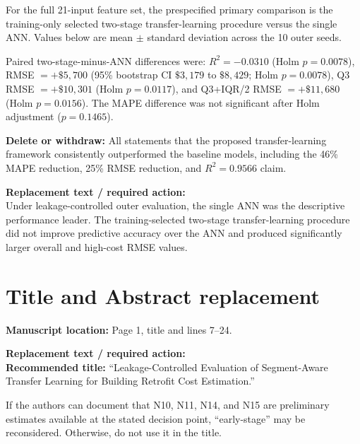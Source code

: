 \documentclass[10pt]{article}
\newcommand{\loc}[1]{\textbf{Manuscript location:} #1}
\newcommand{\replacewith}[1]{\textbf{Replacement text / required action:}\\{\color{revisionblue}#1}}
\newcommand{\deleteitem}[1]{\textbf{Delete or withdraw:} {\color{deleteRed}#1}}
\begin{document}
For the full 21-input feature set, the prespecified primary comparison is the training-only selected two-stage transfer-learning procedure versus the single ANN. Values below are mean $\pm$ standard deviation across the 10 outer seeds.

\begin{center}
\end{center}

Paired two-stage-minus-ANN differences were: $R^2=-0.0310$ (Holm $p=0.0078$), RMSE $=+\$5{,}700$ (95\% bootstrap CI $\$3{,}179$ to $\$8{,}429$; Holm $p=0.0078$), Q3 RMSE $=+\$10{,}301$ (Holm $p=0.0117$), and Q3+IQR/2 RMSE $=+\$11{,}680$ (Holm $p=0.0156$). The MAPE difference was not significant after Holm adjustment ($p=0.1465$).

\deleteitem{All statements that the proposed transfer-learning framework consistently outperformed the baseline models, including the 46\% MAPE reduction, 25\% RMSE reduction, and $R^2=0.9566$ claim.}

\replacewith{Under leakage-controlled outer evaluation, the single ANN was the descriptive performance leader. The training-selected two-stage transfer-learning procedure did not improve predictive accuracy over the ANN and produced significantly larger overall and high-cost RMSE values.}

\clearpage
\section{Title and Abstract replacement}
\label{sec:titleabstract}

\loc{Page 1, title and lines 7--24.}

\replacewith{\textbf{Recommended title:} ``Leakage-Controlled Evaluation of Segment-Aware Transfer Learning for Building Retrofit Cost Estimation.''}

If the authors can document that N10, N11, N14, and N15 are preliminary estimates available at the stated decision point, ``early-stage'' may be reconsidered. Otherwise, do not use it in the title.
\end{document}
